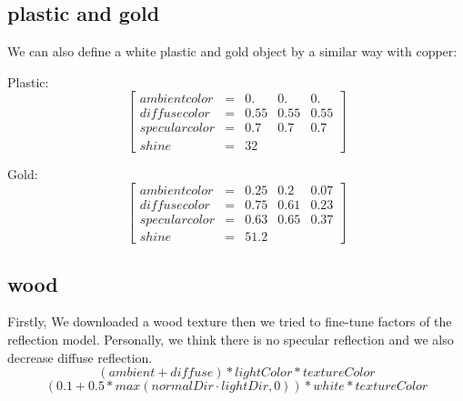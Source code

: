 \documentclass{article}
\begin{document}
\subsection*{plastic and gold}
We can also define a white plastic and gold object by a similar way with copper:

Plastic:
$$
  \begin{bmatrix}
    ambient color  & = & 0. & 0.& 0.\\
    diffuse color  & = & 0.55 & 0.55 & 0.55 \\
    specular color & = & 0.7 & 0.7 & 0.7 \\
    shine          & = & 32
  \end{bmatrix}
$$

Gold:
$$
  \begin{bmatrix}
    ambient color  & = & 0.25 & 0.2 & 0.07 \\
    diffuse color  & = & 0.75 & 0.61 & 0.23 \\
    specular color & = & 0.63 & 0.65 & 0.37 \\
    shine          & = & 51.2
  \end{bmatrix}
$$

\subsection*{wood}
Firstly, We downloaded a wood texture then we tried to fine-tune factors of the reflection model. Personally, we think there is no specular reflection and we also decrease diffuse reflection.
\begin{equation*}
  (ambient + diffuse) * lightColor * textureColor
\end{equation*}
\begin{equation*}
  (0.1 + 0.5*max(normalDir \cdot lightDir, 0)) * white * textureColor
\end{equation*}
\end{document}
